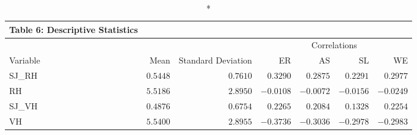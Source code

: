 \begin{longtable}{lrrrrrr}
\caption*{
{\large Table 6: Descriptive Statistics}
} \\ 
\toprule
 &  &  & \multicolumn{4}{c}{Correlations} \\ 
\cmidrule(lr){4-7}
Variable & Mean & Standard Deviation & ER & AS & SL & WE \\ 
\midrule
SJ\_RH & $0.5448$ & $0.7610$ & $0.3290$ & $0.2875$ & $0.2291$ & $0.2977$ \\ 
RH & $5.5186$ & $2.8950$ & $-0.0108$ & $-0.0072$ & $-0.0156$ & $-0.0249$ \\ 
SJ\_VH & $0.4876$ & $0.6754$ & $0.2265$ & $0.2084$ & $0.1328$ & $0.2254$ \\ 
VH & $5.5400$ & $2.8955$ & $-0.3736$ & $-0.3036$ & $-0.2978$ & $-0.2983$ \\ 
\bottomrule
\end{longtable}

